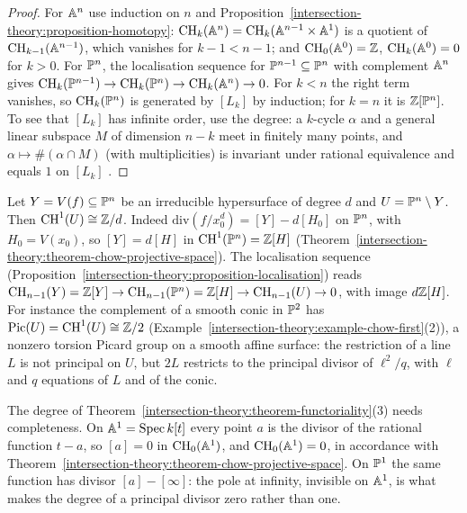 \begin{proof}
For $\mathbb{A}^n$ use induction on $n$ and Proposition~\ref{intersection-theory:proposition-homotopy}: $\operatorname{CH}_k(\mathbb{A}^n) = \operatorname{CH}_k(\mathbb{A}^{n-1} \times \mathbb{A}^1)$ is a quotient of
$\operatorname{CH}_{k-1}(\mathbb{A}^{n-1})$, which vanishes for $k - 1 < n - 1$; and $\operatorname{CH}_0(\mathbb{A}^0) = \mathbb{Z}$, $\operatorname{CH}_k(\mathbb{A}^0) = 0$ for $k > 0$. For $\mathbb{P}^n$, the localisation sequence for
$\mathbb{P}^{n-1} \subseteq \mathbb{P}^n$ with complement $\mathbb{A}^n$ gives $\operatorname{CH}_k(\mathbb{P}^{n-1}) \to \operatorname{CH}_k(\mathbb{P}^n) \to \operatorname{CH}_k(\mathbb{A}^n) \to 0$. For $k < n$ the right term vanishes, so $\operatorname{CH}_k(\mathbb{P}^n)$ is generated by
$[L_k]$ by induction; for $k = n$ it is $\mathbb{Z}[\mathbb{P}^n]$. To see that $[L_k]$ has infinite order, use the degree: a $k$-cycle $\alpha$ and a general linear subspace $M$ of dimension $n - k$ meet in
finitely many points, and $\alpha \mapsto \#(\alpha \cap M)$ (with multiplicities) is invariant under rational equivalence and equals $1$ on $[L_k]$
\cite[Chapter 1]{fulton-intersection}.
\end{proof}

\begin{example}\label{intersection-theory:example-hypersurface-complement}
Let $Y = V(f) \subseteq \mathbb{P}^n$ be an irreducible hypersurface of degree $d$ and $U = \mathbb{P}^n \setminus Y$. Then $\operatorname{CH}^1(U) \cong \mathbb{Z}/d$. Indeed $\mathrm{div}(f/x_0^d) = [Y] - d[H_0]$ on $\mathbb{P}^n$, with $H_0 = V(x_0)$, so
$[Y] = d[H]$ in $\operatorname{CH}^1(\mathbb{P}^n) = \mathbb{Z}[H]$ (Theorem~\ref{intersection-theory:theorem-chow-projective-space}). The localisation sequence (Proposition~\ref{intersection-theory:proposition-localisation}) reads
$\operatorname{CH}_{n-1}(Y) = \mathbb{Z}[Y] \to \operatorname{CH}_{n-1}(\mathbb{P}^n) = \mathbb{Z}[H] \to \operatorname{CH}_{n-1}(U) \to 0$, with image $d\mathbb{Z}[H]$. For instance the complement of a smooth conic in $\mathbb{P}^2$ has $\operatorname{Pic}(U) = \operatorname{CH}^1(U) \cong \mathbb{Z}/2$
(Example~\ref{intersection-theory:example-chow-first}(2)), a nonzero torsion Picard group on a smooth affine surface: the restriction of a line $L$ is not principal on $U$, but $2L$ restricts to the principal
divisor of $\ell^2/q$, with $\ell$ and $q$ equations of $L$ and of the conic.
\end{example}

\begin{counterexample}\label{intersection-theory:counterexample-degree-affine}
The degree of Theorem~\ref{intersection-theory:theorem-functoriality}(3) needs completeness. On $\mathbb{A}^1 = \operatorname{Spec} k[t]$ every point $a$ is the divisor of the rational function $t - a$, so $[a] = 0$ in $\operatorname{CH}_0(\mathbb{A}^1)$, and
$\operatorname{CH}_0(\mathbb{A}^1) = 0$, in accordance with Theorem~\ref{intersection-theory:theorem-chow-projective-space}. On $\mathbb{P}^1$ the same function has divisor $[a] - [\infty]$: the pole at infinity, invisible on $\mathbb{A}^1$, is what
makes the degree of a principal divisor zero rather than one.
\end{counterexample}

